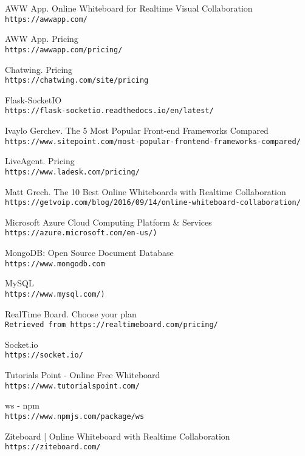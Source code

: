 \documentclass[10pt]{article}
\begin{document}
              \clearpage  
\begin{thebibliography}{9}

AWW App. Online Whiteboard for Realtime Visual Collaboration
\\\texttt{https://awwapp.com/}

AWW App. Pricing
\\\texttt{https://awwapp.com/pricing/}

Chatwing. Pricing
\\\texttt{https://chatwing.com/site/pricing}

Flask-SocketIO
\\\texttt{https://flask-socketio.readthedocs.io/en/latest/}

Ivaylo Gerchev. The 5 Most Popular Front-end Frameworks Compared
\\\texttt{https://www.sitepoint.com/most-popular-frontend-frameworks-compared/}

LiveAgent. Pricing
\\\texttt{https://www.ladesk.com/pricing/}

Matt Grech. The 10 Best Online Whiteboards with Realtime Collaboration
\\\texttt{https://getvoip.com/blog/2016/09/14/online-whiteboard-collaboration/}

Microsoft Azure Cloud Computing Platform \& Services
\\\texttt{https://azure.microsoft.com/en-us/)}

MongoDB: Open Source Document Database
\\\texttt{https://www.mongodb.com}

MySQL
\\\texttt{https://www.mysql.com/)}

RealTime Board. Choose your plan
\\\texttt{Retrieved from https://realtimeboard.com/pricing/}

Socket.io
\\\texttt{https://socket.io/}

Tutorials Point - Online Free Whiteboard
\\\texttt{https://www.tutorialspoint.com/}

ws - npm
\\\texttt{https://www.npmjs.com/package/ws}

Ziteboard | Online Whiteboard with Realtime Collaboration
\\\texttt{https://ziteboard.com/}

\end{thebibliography}
\end{document}
